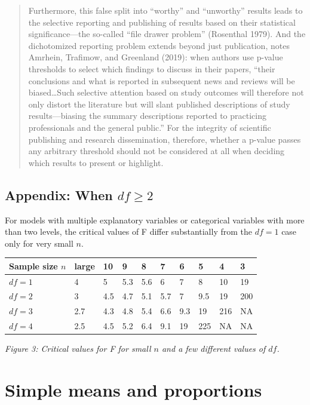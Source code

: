 \documentclass[]{book}
\begin{document}
\begin{quote}
Furthermore, this false split into ``worthy'' and ``unworthy'' results leads to the selective reporting and publishing of results based on their statistical significance---the so-called ``file drawer problem'' (Rosenthal 1979). And the dichotomized reporting problem extends beyond just publication, notes Amrhein, Trafimow, and Greenland (2019): when authors use p-value thresholds to select which findings to discuss in their papers, ``their conclusions and what is reported in subsequent news and reviews will be biased\ldots{}Such selective attention based on study outcomes will therefore not only distort the literature but will slant published descriptions of study results---biasing the summary descriptions reported to practicing professionals and the general public.'' For the integrity of scientific publishing and research dissemination, therefore, whether a p-value passes any arbitrary threshold should not be considered at all when deciding which results to present or highlight.
\end{quote}

\hypertarget{appendix-when-df-geq-2}{%
\section{\texorpdfstring{Appendix: When \(df \geq 2\)}{Appendix: When df \textbackslash{}geq 2}}\label{appendix-when-df-geq-2}}

For models with multiple explanatory variables or categorical variables with more than two levels, the critical values of F differ substantially from the \(df = 1\) case only for very small \(n\).

\begin{longtable}[]{@{}llllllllll@{}}
\toprule
Sample size \(n\) & large & 10 & 9 & 8 & 7 & 6 & 5 & 4 & 3\tabularnewline
\midrule
\endhead
\(df = 1\) & 4 & 5 & 5.3 & 5.6 & 6 & 7 & 8 & 10 & 19\tabularnewline
\(df = 2\) & 3 & 4.5 & 4.7 & 5.1 & 5.7 & 7 & 9.5 & 19 & 200\tabularnewline
\(df = 3\) & 2.7 & 4.3 & 4.8 & 5.4 & 6.6 & 9.3 & 19 & 216 & NA\tabularnewline
\(df = 4\) & 2.5 & 4.5 & 5.2 & 6.4 & 9.1 & 19 & 225 & NA & NA\tabularnewline
\bottomrule
\end{longtable}

\emph{Figure 3: Critical values for F for small \(n\) and a few different values of \(df\).}

\hypertarget{simple-means-and-proportions}{%
\chapter{Simple means and proportions}\label{simple-means-and-proportions}}
\end{document}
